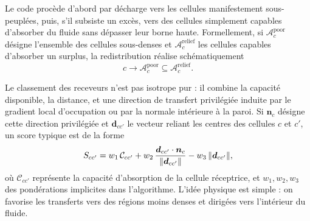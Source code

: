 \documentclass[11pt,a4paper]{article}
\begin{document}
Le code procède d'abord par décharge vers les cellules manifestement sous-peuplées, puis, s'il subsiste un excès, vers des cellules simplement capables d'absorber du fluide sans dépasser leur borne haute. Formellement, si $\mathcal{A}_c^{\mathrm{poor}}$ désigne l'ensemble des cellules sous-denses et $\mathcal{A}_c^{\mathrm{relief}}$ les cellules capables d'absorber un surplus, la redistribution réalise schématiquement
\begin{equation}
  c \longrightarrow \mathcal{A}_c^{\mathrm{poor}} \subseteq \mathcal{A}_c^{\mathrm{relief}}.
\end{equation}

Le classement des receveurs n'est pas isotrope pur : il combine la capacité disponible, la distance, et une direction de transfert privilégiée induite par le gradient local d'occupation ou par la normale intérieure à la paroi. Si $\bm{n}_c$ désigne cette direction privilégiée et $\bm{d}_{cc'}$ le vecteur reliant les centres des cellules $c$ et $c'$, un score typique est de la forme
\begin{equation}
  S_{cc'} = w_1\,\mathcal{C}_{cc'} + w_2\,\frac{\bm{d}_{cc'}\cdot \bm{n}_c}{\norm{\bm{d}_{cc'}}} - w_3\,\norm{\bm{d}_{cc'}},
\end{equation}
où $\mathcal{C}_{cc'}$ représente la capacité d'absorption de la cellule réceptrice, et $w_1,w_2,w_3$ des pondérations implicites dans l'algorithme. L'idée physique est simple : on favorise les transferts vers des régions moins denses et dirigées vers l'intérieur du fluide.
\end{document}
